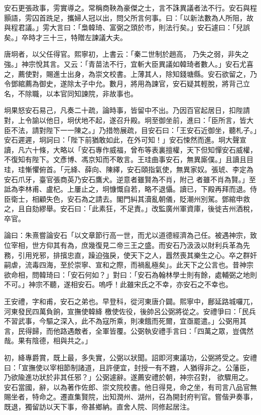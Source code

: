 \begin{pinyinscope}
 安石更張政事，雱實導之。常稱商鞅為豪傑之士，言不誅異議者法不行。安石與程顥語，雱囚首跣足，攜婦人冠以出，問父所言何事。曰：「以新法數為人所阻，故與程君議。」雱大言曰：「梟韓琦、富弼之頭於市，則法行矣。」安石遽曰：「兒誤矣。」卒時才三十三，特贈左諫議大夫。



 唐坰者，以父任得官。熙寧初，上書云：「秦二世制於趙高，
 乃失之弱，非失之強。」神宗悅其言。又云：「青苗法不行，宜斬大臣異議如韓琦者數人。」安石尤喜之，薦使對，賜進士出身，為崇文校書。上薄其人，除知錢塘縣。安石欲留之，乃令鄧綰薦為御史，遂除太子中允。數月，將用為諫官，安石疑其輕脫，將背己立名，不除職，以本官同知諫院，非故事也。



 坰果怒安石易己，凡奏二十疏，論時事，皆留中不出。乃因百官起居日，扣陛請對，上令諭以他日，坰伏地不起，遂召升殿。坰至御坐前，進曰：「臣所言，皆大
 臣不法，請對陛下一一陳之。」乃措笏展疏，目安石曰：「王安石近御坐，聽札子。」安石遲遲，坰訶曰：「陛下前猶敢如此，在外可知！」安石悚然而進。坰大聲宣讀，凡六十條，大略以「安石專作威福，曾布等表裏擅權，天下但知憚安石威權，不復知有陛下。文彥博、馮京知而不敢言。王珪曲事安石，無異廝僕。」且讀且目珪，珪慚懼俯首。「元絳、薛向、陳繹，安石頤指氣使，無異家奴。張琥、李定為安石爪牙，臺官張商英乃安石鷹犬。逆意者雖賢為不肖，附己
 者雖不肖為賢。」至詆為李林甫、盧杞。上屢止之，坰慷慨自若，略不退懾。讀已，下殿再拜而退。侍臣衛士，相顧失色，安石為之請去。閣門糾其瀆亂朝儀，貶潮州別駕。鄧綰申救之，且自劾繆舉。安石曰：「此素狂，不足責。」改監廣州軍資庫，後徙吉州酒稅，卒官。



 論曰：朱熹嘗論安石「以文章節行高一世，而尤以道德經濟為己任。被遇神宗，致位宰相，世方仰其有為，庶幾復見二帝三王之盛。而安石乃汲汲以財利兵革為先
 務，引用兇邪，排擯忠直，躁迫強戾，使天下之人，囂然喪其樂生之心。卒之群奸嗣虐，流毒四海，至於崇寧、宣和之際，而禍亂極矣」。此天下之公言也。昔神宗欲命相，問韓琦曰：「安石何如？」對曰：「安石為翰林學士則有餘，處輔弼之地則不可。」神宗不聽，遂相安石。嗚呼！此雖宋氏之不幸，亦安石之不幸也。



 王安禮，字和甫，安石之弟也。早登科，從河東唐介闢。熙寧中，鄜延路城囉兀，河東發民四萬負餉，宣撫使韓絳
 檄使佐役，後帥呂公弼將從之。安禮爭曰：「民兵不習武事，今驅之深入，此不為寇所乘，則凍餓而死爾，宜亟罷遣。」公弼用其言，民得歸，而他路遇敵者，全軍皆覆。公弼執安禮手言曰：「四萬之眾，豈偶然哉。果有陰德，相與共之。」



 初，絳專爵賞，既上最，多失實，公弼以狀聞。詔即河東議功，公弼將受之。安禮曰：「宣撫使以宰相節制諸道，且許便宜，封授一有不韙，人猶得非之。公藩臣，乃欲隃進功狀於非其任邪？」公弼遽辭。遂薦安禮於朝，神宗召對，
 欲驟用之。安石當國，辭，以為著作佐郎、崇文院校書。他日得見，命之坐，有司言八品官無賜坐者，特命之。遷直集賢院，出知潤州、湖州，召為開封府判官。嘗偕尹奏事，既退，獨留訪以天下事，帝甚鄉納。直舍人院、同修起居注。




\end{pinyinscope}
